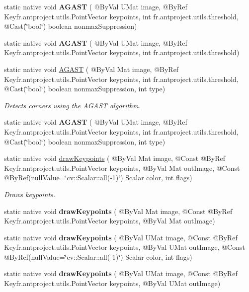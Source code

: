 \begin{DoxyCompactItemize}
\item 
static native void {\bfseries A\+G\+A\+ST} ( @By\+Val U\+Mat image, @By\+Ref Key\+fr.antproject.utils.Point\+Vector keypoints, int fr.antproject.utils.threshold, @Cast(\char`\"{}bool\char`\"{}) boolean nonmax\+Suppression)
\item 
static native void {\bfseries A\+G\+A\+ST} ( @By\+Val U\+Mat image, @By\+Ref Key\+fr.antproject.utils.Point\+Vector keypoints, int fr.antproject.utils.threshold)
\item 
static native void \hyperlink{group__features2d__main_ga2126ee1b1b70316ae0fd6ffb3d2d51bc}{A\+G\+A\+ST} ( @By\+Val Mat image, @By\+Ref Key\+fr.antproject.utils.Point\+Vector keypoints, int fr.antproject.utils.threshold, @Cast(\char`\"{}bool\char`\"{}) boolean nonmax\+Suppression, int type)
\begin{DoxyCompactList}\small\item\em Detects corners using the A\+G\+A\+ST algorithm. \end{DoxyCompactList}\item 
static native void {\bfseries A\+G\+A\+ST} ( @By\+Val U\+Mat image, @By\+Ref Key\+fr.antproject.utils.Point\+Vector keypoints, int fr.antproject.utils.threshold, @Cast(\char`\"{}bool\char`\"{}) boolean nonmax\+Suppression, int type)
\item 
static native void \hyperlink{group__features2d__draw_gab17ce5fe7286fa915dae6cdf8cb80740}{draw\+Keypoints} ( @By\+Val Mat image, @Const @By\+Ref Key\+fr.antproject.utils.Point\+Vector keypoints, @By\+Val Mat out\+Image, @Const @By\+Ref(null\+Value=\char`\"{}cv\+::\+Scalar\+::all(-\/1)\char`\"{}) Scalar color, int flags)
\begin{DoxyCompactList}\small\item\em Draws keypoints. \end{DoxyCompactList}\item 
static native void {\bfseries draw\+Keypoints} ( @By\+Val Mat image, @Const @By\+Ref Key\+fr.antproject.utils.Point\+Vector keypoints, @By\+Val Mat out\+Image)
\item 
static native void {\bfseries draw\+Keypoints} ( @By\+Val U\+Mat image, @Const @By\+Ref Key\+fr.antproject.utils.Point\+Vector keypoints, @By\+Val U\+Mat out\+Image, @Const @By\+Ref(null\+Value=\char`\"{}cv\+::\+Scalar\+::all(-\/1)\char`\"{}) Scalar color, int flags)
\item 
static native void {\bfseries draw\+Keypoints} ( @By\+Val U\+Mat image, @Const @By\+Ref Key\+fr.antproject.utils.Point\+Vector keypoints, @By\+Val U\+Mat out\+Image)

\end{DoxyCompactItemize}
